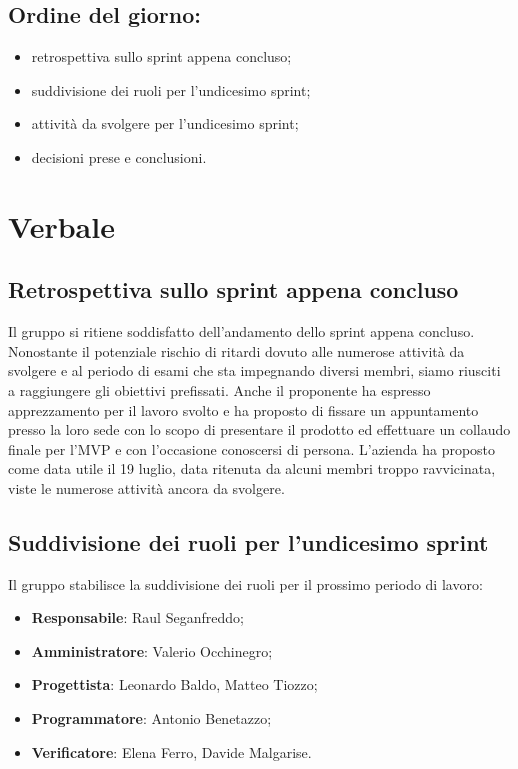 \documentclass[italian,12pt]{article}
\begin{document}
\subsection*{Ordine del giorno:}
\begin{itemize}
	\item retrospettiva sullo sprint appena concluso;
	\item suddivisione dei ruoli per l'undicesimo sprint;
	\item attività da svolgere per l'undicesimo sprint;
	\item decisioni prese e conclusioni.
\end{itemize}


\newpage

\section{Verbale}

\subsection{Retrospettiva sullo sprint appena concluso}
Il gruppo si ritiene soddisfatto dell'andamento dello sprint appena concluso. Nonostante il potenziale rischio di ritardi dovuto alle numerose attività da svolgere e al periodo di esami che sta impegnando diversi membri, siamo riusciti a raggiungere gli obiettivi prefissati. Anche il proponente ha espresso apprezzamento per il lavoro svolto e ha proposto di fissare un appuntamento presso la loro sede con lo scopo di presentare il prodotto ed effettuare un collaudo finale per l'MVP e con l'occasione conoscersi di persona. L'azienda ha proposto come data utile il 19 luglio, data ritenuta da alcuni membri troppo ravvicinata, viste le numerose attività ancora da svolgere.

\subsection{Suddivisione dei ruoli per l'undicesimo sprint}
Il gruppo stabilisce la suddivisione dei ruoli per il prossimo periodo di lavoro:
\begin{itemize}
	\item \textbf{Responsabile}: Raul Seganfreddo;
	\item \textbf{Amministratore}: Valerio Occhinegro;
	\item \textbf{Progettista}: Leonardo Baldo, Matteo Tiozzo;
	\item \textbf{Programmatore}: Antonio Benetazzo;
	\item \textbf{Verificatore}: Elena Ferro, Davide Malgarise.
\end{itemize}
\end{document}
